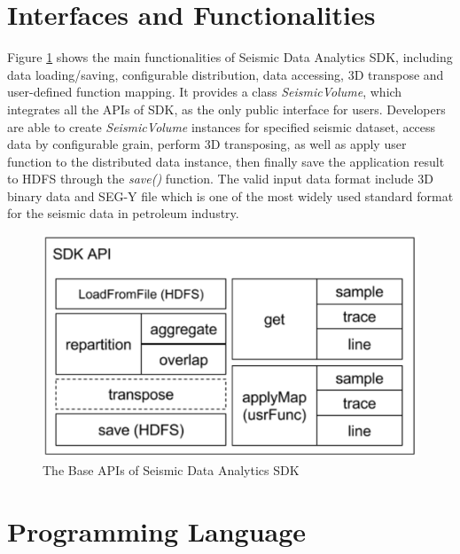 \section{Interfaces and Functionalities}

Figure \ref{sdk_interface} shows the main functionalities of Seismic Data Analytics SDK, including data loading/saving, configurable distribution, data accessing, 3D transpose and user-defined function mapping. It provides a class \emph{SeismicVolume}, which integrates all the APIs of SDK, as the only public interface for users. Developers are able to create \emph{SeismicVolume} instances for specified seismic dataset, access data by configurable grain, perform 3D transposing, as well as apply user function to the distributed data instance, then finally save the application result to HDFS through the \emph{save()} function. The valid input data format include 3D binary data and SEG-Y file \cite{SEGDREV21} which is one of the most widely used standard format for the seismic data in petroleum industry.

\begin{figure}[h]
\centering
\includegraphics[scale=0.6]{figures/sdk_interface.png}
\caption{The Base APIs of Seismic Data Analytics SDK}
\label{sdk_interface}
\end{figure}

\section{Programming Language}

